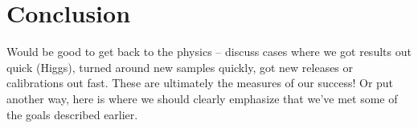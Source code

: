 \documentclass [draft,notitlepage] {article}
\begin{document}
\section{Conclusion}
Would be good to get back to the physics -- discuss cases where we got results out quick (Higgs), turned around new samples quickly, got new releases or calibrations out fast.  These are ultimately the measures of our success!  Or put another way, here is where we should clearly emphasize that we’ve met some of the goals described earlier.




\newpage


\end{document}
